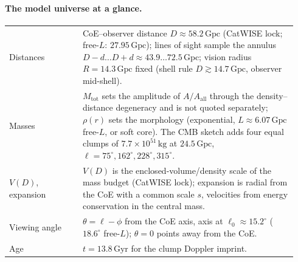\documentclass[11pt,a4paper]{article}
\begin{document}
\paragraph{The model universe at a glance.}
\begin{center}\footnotesize
\begin{tabular}{@{}p{0.24\linewidth}p{0.70\linewidth}@{}}
\toprule
Distances & CoE--observer distance \(D\approx58.2\,\mathrm{Gpc}\) (CatWISE lock; free-\(L\): \(27.95\,\mathrm{Gpc}\)); lines of sight sample the annulus \(D{-}d\ldots D{+}d\approx43.9\ldots72.5\,\mathrm{Gpc}\); vision radius \(R=14.3\,\mathrm{Gpc}\) fixed (shell rule \(D\gtrsim14.7\,\mathrm{Gpc}\), observer mid-shell). \\
Masses & \(M_{\mathrm{tot}}\) sets the amplitude of \(A/A_{\mathrm{all}}\) through the density--distance degeneracy and is not quoted separately; \(\rho(r)\) sets the morphology (exponential, \(L\approx6.07\,\mathrm{Gpc}\) free-\(L\), or soft core). The CMB sketch adds four equal clumps of \(7.7\times10^{51}\,\mathrm{kg}\) at \(24.5\,\mathrm{Gpc}\), \(\ell=75^\circ,162^\circ,228^\circ,315^\circ\). \\
\(V(D)\), expansion & \(V(D)\) is the enclosed-volume/density scale of the mass budget (CatWISE lock); expansion is radial from the CoE with a common scale \(s\), velocities from energy conservation in the central mass. \\
Viewing angle & \(\theta=\ell-\phi\) from the CoE axis, axis at \(\ell_0\approx15.2^\circ\) (\(18.6^\circ\) free-\(L\)); \(\theta=0\) points away from the CoE. \\
Age & \(t=13.8\,\mathrm{Gyr}\) for the clump Doppler imprint. \\
\bottomrule
\end{tabular}
\end{center}

\FloatBarrier
\clearpage
\appendix
\captionsetup{skip=2pt,font=footnotesize,labelfont=bf}
\end{document}
